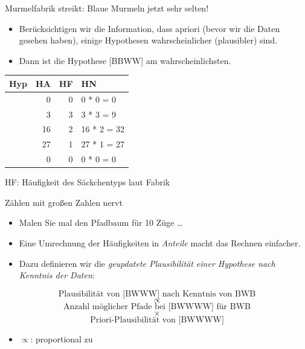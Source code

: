 \documentclass[
  ngerman,
  ignorenonframetext,
]{beamer}
\providecommand{\tightlist}{%
  \setlength{\itemsep}{0pt}\setlength{\parskip}{0pt}}
\begin{document}
\begin{frame}{Murmelfabrik streikt: Blaue Murmeln jetzt sehr selten!}
\protect\hypertarget{murmelfabrik-streikt-blaue-murmeln-jetzt-sehr-selten}{}
\begin{itemize}
\item
  Berücksichtigen wir die Information, dass apriori (bevor wir die Daten
  gesehen haben), einige Hypothesen wahrscheinlicher (plausibler) sind.
\item
  Dann ist die Hypothese {[}BBWW{]} am wahrscheinlichsten.
\end{itemize}

\begin{tabular}{l|r|r|l}
\hline
Hyp & HA & HF & HN\\
\hline
[W W W W] & 0 & 0 & 0 * 0 = 0\\
\hline
[B W W W] & 3 & 3 & 3 * 3 = 9\\
\hline
[B B W W] & 16 & 2 & 16 * 2 = 32\\
\hline
[B B B W] & 27 & 1 & 27 * 1 = 27\\
\hline
[B B B B] & 0 & 0 & 0 * 0 = 0\\
\hline
\end{tabular}

HF: Häufigkeit des Säckchentyps laut Fabrik
\end{frame}

\begin{frame}{Zählen mit großen Zahlen nervt}
\protect\hypertarget{zuxe4hlen-mit-grouxdfen-zahlen-nervt}{}
\begin{itemize}
\item
  Malen Sie mal den Pfadbaum für 10 Züge \ldots{}
\item
  Eine Umrechnung der Häufigkeiten in \emph{Anteile} macht das Rechnen
  einfacher.
\item
  Dazu definieren wir die \emph{geupdatete Plausibilität einer Hypothese
  nach Kenntnis der Daten}:
\end{itemize}

\[\text{Plausibilität von [BWWW] nach Kenntnis von BWB}\] \[\propto\]
\[\text{Anzahl möglicher Pfade bei [BWWWW] für BWB}\] \[\times\]
\[\text{Priori-Plausibilität von [BWWWW]}\]

\begin{itemize}
\tightlist
\item
  \(\propto\): proportional zu
\end{itemize}
\end{frame}
\end{document}
